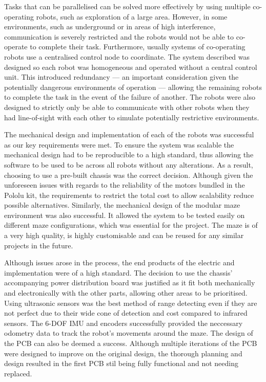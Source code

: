 











Tasks that can be parallelised can be solved more 
effectively by using multiple co-operating robots, such as exploration of a large 
area. However, in some environments, such as underground or in areas of high 
interference, communication is severely restricted and the robots would not be able
to co-operate to complete their task. Furthermore, usually systems of co-operating robots 
use a centralised control node to coordinate. The system described was designed so each robot was 
homogeneous and operated without a central control unit. This introduced redundancy ---
an important consideration given the potentially dangerous environments of operation --- allowing 
the remaining robots to complete the task in the event of the failure of another. 
The robots were also designed to strictly only be able to communicate with other robots 
when they had line-of-sight with each other to simulate potentially restrictive 
environments.  

The mechanical design and implementation of each of the robots was 
successful as our key requirements were met. To ensure the system was  
scalable the mechanical design had to be reproducible to a high standard, thus allowing the software to be used to be across all robots without any alterations. As a 
result, choosing to use a pre-built chassis was the correct decision. Although given 
the unforeseen issues with regards to the reliability of the motors bundled in the Pololu kit, the 
requirements to restrict the total cost to allow scalability reduce possible alternatives. Similarly, the mechanical design of the modular maze environment was also successful. It allowed the system to be tested easily on
different maze configurations, which was essential for the project. The maze is of a very high quality, is highly 
customisable and can be reused for any similar projects in the future.

Although issues arose in the process, the end products of the electric 
and implementation were of a high standard. The decision to use the chassis'
accompanying power distribution board was justified as it fit both
mechanically and electronically with the other parts, allowing other areas to be 
prioritised. Using ultrasonic sensors was the best method of range detecting even if
they are not perfect due to their wide cone of detection and
cost compared to infrared sensors. The 6-DOF IMU and encoders successfully
provided the neccessary odometry data to track the robot's movements around the
maze. The design of the PCB can also be deemed a success. Although multiple 
iterations of the PCB were designed to improve on the original design, the
thorough planning and design resulted in the first PCB stil being fully functional 
and not needing replaced. 

